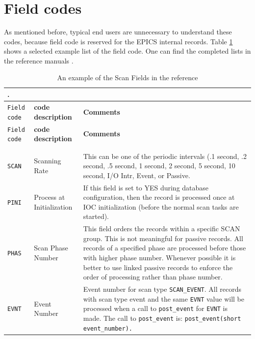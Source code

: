 \documentclass[11pt
  , a4paper
  , article
  , oneside
]{memoir}
\begin{document}
\section{Field codes}
As mentioned before, typical end users are unnecessary to understand these codes, because field code is reserved for the EPICS internal records. Table \ref{table:fieldcodes} shows a selected example list of the field code. One can find the completed lists in the reference manuals \cite{EPICS3.14.12.3, EPICS3.14-RRM}. 
\begin{center}
\begin{longtable}[!hbt]{>{\raggedleft\arraybackslash}p{1cm} |p{3.3cm}| p{9cm}}
\caption{An example of the Scan Fields in the reference \cite{EPICS3.14-RRM}}.
\label{table:fieldcodes}\\
\toprule
\texttt{Field code} & \textbf{code description} &  \textbf{Comments}\\
\midrule
\endfirsthead
\toprule
\texttt{Field code} & \textbf{code description} &  \textbf{Comments}\\
\midrule
\endhead
\midrule \multicolumn{3}{r}{\tablename\ \thetable\ -- \textit{Continued on next page}} \\
\bottomrule
\endfoot
\bottomrule
\endlastfoot
&\\
\texttt{SCAN}    & Scanning Rate & This can be one of the periodic intervals (.1 second, .2 second, .5 second, 1 second, 2 second, 5 second, 10 second, I/O Intr, Event, or Passive.\\
\texttt{PINI}    & Process at Initialization & If this field is set to YES during database configuration, then the record is processed once at IOC initialization (before the normal scan tasks are started).\\
\texttt{PHAS}    & Scan Phase Number & This field orders the records within a specific SCAN group. This is not meaningful for passive records. All records of a specified phase are processed before those with higher phase number. Whenever possible it is better to use linked passive records to enforce the order of processing rather than phase number.\\
\texttt{EVNT}    & Event Number & Event number for scan type \texttt{SCAN\_EVENT}. All records with scan type event and the same \texttt{EVNT} value will be processed when a call to \texttt{post\_event} for \texttt{EVNT} is made. The call to \texttt{post\_event} is: \texttt{post\_event(short event\_number).}\\

\end{longtable}
\end{center}
\end{document}
